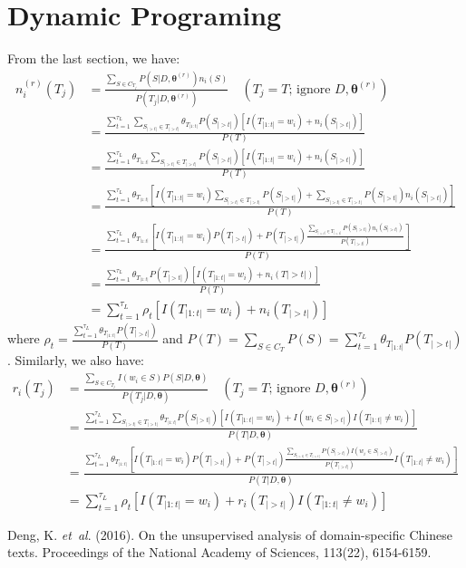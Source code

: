 \documentclass[12pt]{article}
\begin{document}
\section{Dynamic Programing}
From the last section, we have:
\begin{align*}
n_i^{(r)}(T_j) &= \frac{\sum_{S \in C_{T_j}} P(S|D, \bm{\theta}^{(r)})n_i(S)}{P(T_j|D, \bm{\theta}^{(r)})} \quad (T_j = T \text{; ignore } D, \bm{\theta}^{(r)}) \\
&= \frac{\sum_{t=1}^{\tau_L} \sum_{S_{|>t|} \in T_{|>t|}} \theta_{T_{|1:t|}}P(S_{|>t|}) [I(T_{|1:t|} = w_i) + n_i(S_{|>t|})]}{P(T)} \\
&= \frac{\sum_{t=1}^{\tau_L} \theta_{T_{|1:t|}} \sum_{S_{|>t|} \in T_{|>t|}} P(S_{|>t|}) [I(T_{|1:t|} = w_i) + n_i(S_{|>t|})]}{P(T)} \\
&= \frac{\sum_{t=1}^{\tau_L} \theta_{T_{|1:t|}} [I(T_{|1:t|} = w_i)\sum_{S_{|>t|} \in T_{|>t|}} P(S_{|>t|}) + \sum_{S_{|>t|} \in T_{|>t|}} P(S_{|>t|}) n_i(S_{|>t|})]}{P(T)} \\
&= \frac{\sum_{t=1}^{\tau_L} \theta_{T_{|1:t|}} [I(T_{|1:t|} = w_i) P(T_{|>t|}) + P(T_{|>t|}) \frac{\sum_{S_{|>t|} \in T_{|>t|}} P(S_{|>t|}) n_i(S_{|>t|})}{P(T_{|>t|})} ]}{P(T)} \\
&= \frac{\sum_{t=1}^{\tau_L} \theta_{T_{|1:t|}} P(T_{|>t|}) [I(T_{|1:t|} = w_i) + n_i(T|>t|)]}{P(T)} \\
&= \sum_{t=1}^{\tau_L} \rho_t [I(T_{|1:t|} = w_i) + n_i(T_{|>t|})]
\end{align*}
where $\rho_t = \frac{\sum_{t=1}^{\tau_L} \theta_{T_{|1:t|}} P(T_{|>t|})}{P(T)} $ and $P(T) = \sum_{S \in C_{T}} P(S) = \sum_{t=1}^{\tau_L} \theta_{T_{|1:t|}} P(T_{|>t|})$. Similarly, we also have:
\begin{align*}
r_i(T_j) &= \frac{\sum_{S \in C_{T_j}} I(w_i \in S)P(S|D, \bm{\theta})}{P(T_j|D, \bm{\theta})} \quad (T_j = T \text{; ignore } D, \bm{\theta}^{(r)}) \\
&= \frac{\sum_{t=1}^{\tau_L} \sum_{S_{|>t|} \in T_{|>t|}} \theta_{T_{|1:t|}}P(S_{|>t|}) [I(T_{|1:t|} = w_i) + I(w_i \in S_{|>t|})I(T_{|1:t|} \neq w_i)]}{P(T|D, \bm{\theta})} \\
&= \frac{\sum_{t=1}^{\tau_L} \theta_{T_{|1:t|}} [I(T_{|1:t|} = w_i) P(T_{|>t|}) + P(T_{|>t|}) \frac{\sum_{S_{|>t|} \in T_{|>t|}} P(S_{|>t|}) I(w_i \in S_{|>t|})}{P(T_{|>t|})} I(T_{|1:t|} \neq w_i)]}{P(T|D, \bm{\theta})} \\
&= \sum_{t=1}^{\tau_L} \rho_t [I(T_{|1:t|} = w_i) + r_i(T_{|>t|})I(T_{|1:t|} \neq w_i)]
\end{align*}


%
%

\begin{thebibliography}{}

Deng, K. \textit{et~al}. (2016). On the unsupervised analysis of domain-specific Chinese texts. Proceedings of the National Academy of Sciences, 113(22), 6154-6159.

\end{thebibliography}
\end{document}
